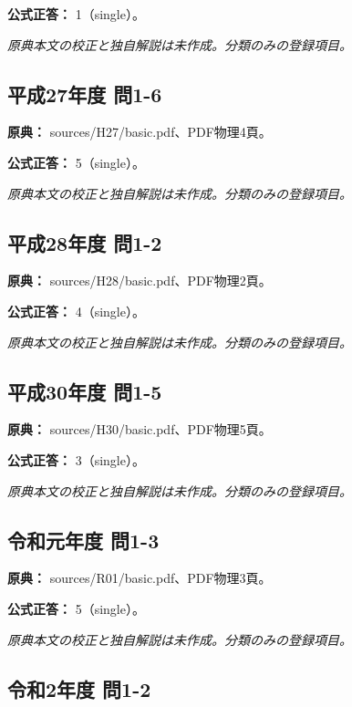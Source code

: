 \textbf{公式正答：} 1（single）。

\par\textit{原典本文の校正と独自解説は未作成。分類のみの登録項目。}

\subsection{平成27年度 問1-6}
\label{q:h27-reg-basic-1-6}

\noindent\textbf{原典：} sources/H27/basic.pdf、PDF物理4頁。

\textbf{公式正答：} 5（single）。

\par\textit{原典本文の校正と独自解説は未作成。分類のみの登録項目。}

\subsection{平成28年度 問1-2}
\label{q:h28-reg-basic-1-2}

\noindent\textbf{原典：} sources/H28/basic.pdf、PDF物理2頁。

\textbf{公式正答：} 4（single）。

\par\textit{原典本文の校正と独自解説は未作成。分類のみの登録項目。}

\subsection{平成30年度 問1-5}
\label{q:h30-reg-basic-1-5}

\noindent\textbf{原典：} sources/H30/basic.pdf、PDF物理5頁。

\textbf{公式正答：} 3（single）。

\par\textit{原典本文の校正と独自解説は未作成。分類のみの登録項目。}

\subsection{令和元年度 問1-3}
\label{q:r01-reg-basic-1-3}

\noindent\textbf{原典：} sources/R01/basic.pdf、PDF物理3頁。

\textbf{公式正答：} 5（single）。

\par\textit{原典本文の校正と独自解説は未作成。分類のみの登録項目。}

\subsection{令和2年度 問1-2}
\label{q:r02-reg-basic-1-2}

